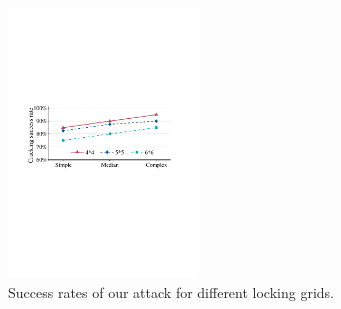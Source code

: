         \begin{figure}[!t]
            \centering
            \includegraphics[width=0.45\textwidth]{fig/scalability.pdf}
            \caption{Success rates of our attack for different locking grids.}
            \label{fig:scalability}
        \end{figure}

